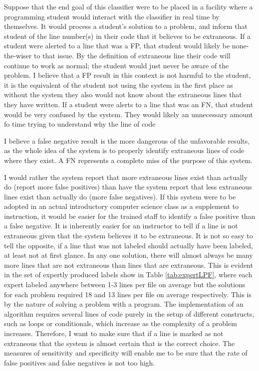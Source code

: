\documentclass[draft]{article}
\begin{document}
Suppose that the end goal of this classifier were to be placed in a facility where a programming student would interact with the classifier in real time by themselves. It would process a student's solution to a problem, and inform that student of the line number(s) in their code that it believes to be extraneous. If a student were alerted to a line that was a FP, that student would likely be none-the-wiser to that issue. By the definition of extraneous line their code will continue to work as normal; the student would just never be aware of the problem. I believe that a FP result in this context is not harmful to the student, it is the equivalent of the student not using the system in the first place as without the system they also would not know about the extraneous lines that they have written. If a student were alerts to a line that was an FN, that student would be very confused by the system. They would likely an unnecessary amount fo time trying to understand why the line of code 

I believe a false negative result is the more dangerous of the unfavorable results, as the whole idea of the system is to properly identify extraneous lines of code where they exist. A FN represents a complete miss of the purpose of this system.



I would rather the system report that more extraneous lines exist than actually do (report more false positives) than have the system report that less extraneous lines exist than actually do (more false negatives). If this system were to be adopted in an actual introductory computer science class as a supplement to instruction, it would be easier for the trained staff to identify a false positive than a false negative. It is inherently easier for an instructor to tell if a line is not extraneous given that the system believes it to be extraneous. It is not so easy to tell the opposite, if a line that was not labeled should actually have been labeled, at least not at first glance. In any one solution, there will almost always be many more lines that are not extraneous than lines that are extraneous. This is evident in the set of expertly produced labels show in Table \ref{tab:expertLPF}, where each expert labeled anywhere between 1-3 lines per file on average but the solutions for each problem required 18 and 13 lines per file on average respectively. This is by the nature of solving a problem with a program. The implementation of an algorithm requires several lines of code purely in the setup of different constructs, such as loops or conditionals, which increase as the complexity of a problem increases. Therefore, I want to make sure that if a line is marked as not extraneous that the system is almost certain that is the correct choice. The measures of sensitivity and specificity will enable me to be sure that the rate of false positives and false negatives is not too high. 
\end{document}
